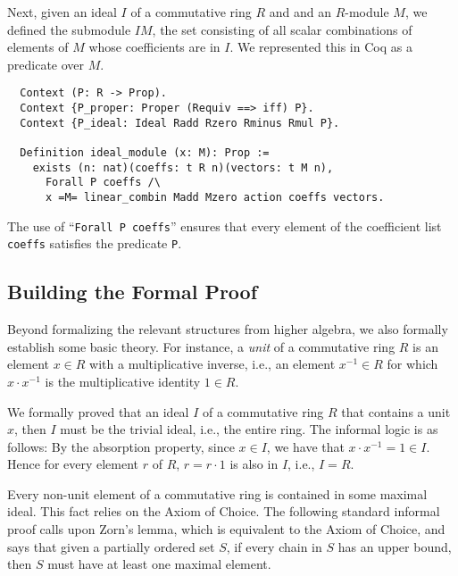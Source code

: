 \documentclass{article}
\begin{document}
Next, given an ideal \(I\) of a commutative ring $R$ and and an $R$-module \(M\), 
we defined the submodule $IM$, the set consisting of all scalar combinations of elements of \(M\) whose coefficients are in  \(I\). We represented this in Coq as a predicate over \(M\).

\begin{verbatim}
  Context (P: R -> Prop).
  Context {P_proper: Proper (Requiv ==> iff) P}.
  Context {P_ideal: Ideal Radd Rzero Rminus Rmul P}.
  
  Definition ideal_module (x: M): Prop :=
    exists (n: nat)(coeffs: t R n)(vectors: t M n),
      Forall P coeffs /\
      x =M= linear_combin Madd Mzero action coeffs vectors.
\end{verbatim}

The use of  ``\verb|Forall P coeffs|'' ensures that every element of the coefficient list
\texttt{coeffs} satisfies the predicate \texttt{P}.  

\subsection{Building the Formal Proof}



Beyond formalizing the relevant structures from higher algebra, we also formally establish some basic theory. 
For instance, a \emph{unit} of a commutative ring $R$ is an element $x \in R$ with a multiplicative inverse, i.e., an element $x^{-1} \in R$ for which $x \cdot x^{-1}$ is the multiplicative identity $1 \in R$.  
 
We formally proved that an ideal $I$ of a commutative ring $R$ that contains a unit $x$, then $I$ must be the trivial ideal, i.e., the entire ring.  The informal logic is as follows:  By the absorption property, since $x \in I$, we have that $x \cdot x^{-1} = 1 \in I$.  Hence for every element $r$ of $R$, $r = r \cdot 1$ is also in $I$, i.e., $I=R$. 

Every non-unit element of a commutative ring is contained in some maximal ideal. 
This fact relies on the Axiom of Choice. 
The following standard informal proof calls upon Zorn's lemma, which is equivalent to the Axiom of Choice, and says that given a partially ordered set $S$, if every chain in $S$ has an upper bound, then $S$ must have at least one maximal element. 
\end{document}
